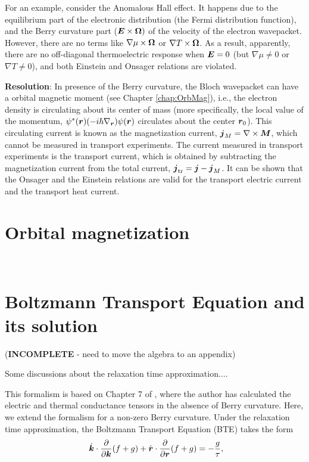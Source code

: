 \documentclass{report}
\renewcommand\vec[1]{\ensuremath\boldsymbol{#1}} %
\begin{document}
For an example, consider the Anomalous Hall effect. It happens due to the equilibrium part of the electronic distribution (the Fermi distribution function), and the Berry curvature part ($\vec{E} \times \vec{\Omega})$ of the velocity of the electron wavepacket. However, there are no terms like $\nabla \mu \times \vec{\Omega}$ or $\nabla T \times \vec{\Omega}$. As a result, apparently, there are no off-diagonal thermoelectric response when $\vec{E} = 0$ (but $\nabla \mu \neq 0$ or $\nabla T \neq 0$), and both Einstein and Onsager relations are violated.

\textbf{Resolution}: In presence of the Berry curvature, the Bloch wavepacket can have a orbital magnetic moment (see Chapter \ref{chap:OrbMag}), i.e., the electron density is circulating about its center of mass (more specifically, the local value of the momentum, $\psi^*(\vec{r}) (-i \hbar \nabla_{\vec{r}}) \psi(\vec{r})$ circulates about the center $\vec{r}_0$). This circulating current is known as the magnetization current, $\vec{j}_M = \nabla \times \vec{M}$, which cannot be measured in transport experiments. The current measured in transport experiments is the transport current, which is obtained by subtracting the magnetization current from the total current, $\vec{j}_{\text{tr}} = \vec{j} - \vec{j}_M$. It can be shown that the Onsager and the Einstein relations are valid for the transport electric current and the transport heat current.


\chapter{Orbital magnetization}~\label{chap:OrbMag}
\chapter{Boltzmann Transport Equation and its solution}\label{sec:BTE-and-solution}
(\textbf{INCOMPLETE} - need to move the algebra to an appendix)

Some discussions about the relaxation time approximation....

This formalism is based on Chapter 7 of \cite{book:ZimanSolidState}, where the author has calculated the electric and thermal conductance tensors in the absence of Berry curvature. Here, we extend the formalism for a non-zero Berry curvature.
Under the relaxation time approximation, the Boltzmann Transport Equation (BTE) takes the form
\begin{equation}~\label{Eq:BTE}
\dot{\vec{k}}\cdot\frac{\partial}{\partial \vec{k}} (f + g) + \dot{\vec{r}}\cdot\frac{\partial}{\partial \vec{r}} (f + g) = -\frac{g}{\tau},
\end{equation}
\end{document}
